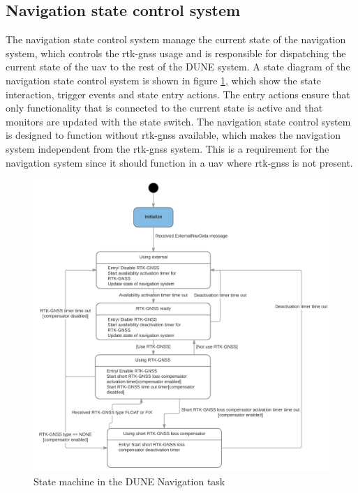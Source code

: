 \subsection{Navigation state control system}\label{S:NavState}
The navigation state control system manage the current state of the navigation system, which controls the \gls{rtk-gnss} usage and is responsible for dispatching the current state of the \gls{uav} to the rest of the DUNE system. A state diagram of the navigation state control system is shown in figure \ref{Fig:NavState}, which show the state interaction, trigger events and state entry actions. The entry actions ensure that only functionality that is connected to the current state is active      and that monitors are updated with the state switch. The navigation state control system is designed to function without \gls{rtk-gnss} available, which makes the navigation system independent from the \gls{rtk-gnss} system. This is a requirement for the navigation system since it should function in a \gls{uav} where \gls{rtk-gnss} is not present.

\begin{figure}[H]
\includegraphics[scale=0.18]{figs/NavigationStateControl.png}
\caption{State machine in the DUNE Navigation task}
\label{Fig:NavState}
\end{figure}

